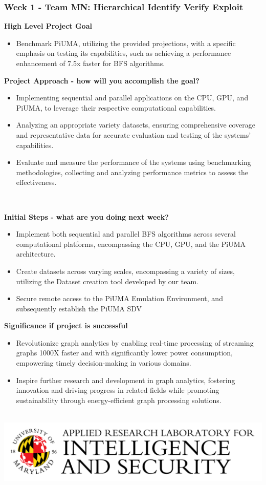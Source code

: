\documentclass[usenames,dvipsnames]{beamer} %
\newcommand\FourQuad[4]{%
    \begin{minipage}[b][.35\textheight][t]{.47\textwidth}#1\end{minipage}\hfill%
    \begin{minipage}[b][.35\textheight][t]{.50\textwidth}#2\end{minipage}\\[0.5em]
    \begin{minipage}[b][.35\textheight][t]{.47\textwidth}#3\end{minipage}\hfill
    \begin{minipage}[b][.35\textheight][t]{.50\textwidth}#4\end{minipage}\\
    \includegraphics[scale=0.05]{Papers/Presentations/Figures/arlis.png} %
}
\begin{document}
    \begin{frame}
        \frametitle{\textcolor{Mahogany}{Week 1 - Team MN: Hierarchical Identify Verify Exploit}}
        \FourQuad%
        {
            \tiny{
                \textbf{High Level Project Goal}  
                \begin{itemize}
                    \item Benchmark PiUMA, utilizing the provided projections, with a specific emphasis on testing its capabilities, such as achieving a performance enhancement of 7.5x faster for BFS algorithms.
                \end{itemize} 
            }
        }%
        {
            \tiny{
                \textbf{Project Approach - how will you accomplish the goal?} 
                \begin{itemize}
                    \item Implementing sequential and parallel applications on the CPU, GPU, and PiUMA, to leverage their respective computational capabilities.
                    \item Analyzing an appropriate variety datasets, ensuring comprehensive coverage and representative data for accurate evaluation and testing of the systems' capabilities.
                    \item Evaluate and measure the performance of the systems using benchmarking methodologies, collecting and analyzing performance metrics to assess the effectiveness.
                \end{itemize}
            }
        }%
        {
            \tiny{
                \textbf{Initial Steps - what are you doing next week?}
                \begin{itemize}
                    \item Implement both sequential and parallel BFS algorithms across several computational platforms, encompassing the CPU, GPU, and the PiUMA architecture. 
                    \item Create datasets across varying scales, encompassing a variety of sizes, utilizing the Dataset creation tool developed by our team. 
                    \item Secure remote access to the PiUMA Emulation Environment, and subsequently establish the PiUMA SDV
                \end{itemize}   
            }
        }%
        {
            \tiny{
                \textbf{Significance if project is successful}
                \begin{itemize}
                    \item Revolutionize graph analytics by enabling real-time processing of streaming graphs 1000X faster and with significantly lower power consumption, empowering timely decision-making in various domains.  
                    \item Inspire further research and development in graph analytics, fostering innovation and driving progress in related fields while promoting sustainability through energy-efficient graph processing solutions.
                \end{itemize} 
            }
        }
    \end{frame}
    
\end{document}
